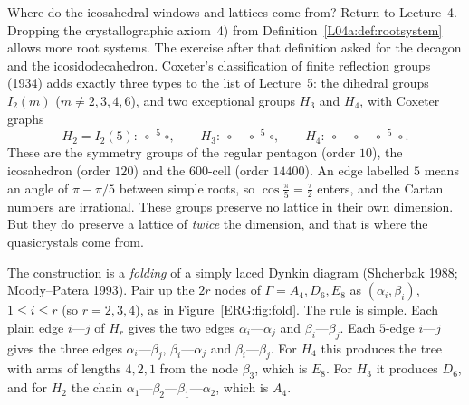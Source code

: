 \documentclass[11pt,openany]{book}
\theoremstyle{plain}
\theoremstyle{definition}
\theoremstyle{remark}
\begin{document}
Where do the icosahedral windows and lattices come from? Return to Lecture~4. Dropping the
crystallographic axiom~4) from Definition~\ref{L04a:def:rootsystem} allows more root systems. The
exercise after that definition asked for the decagon and the icosidodecahedron. Coxeter's classification
of finite reflection groups (1934) adds exactly three types to the list of Lecture~5: the dihedral groups
$I_2(m)$ ($m\neq2,3,4,6$), and two exceptional groups $H_3$ and $H_4$, with Coxeter graphs
\[
  H_2=I_2(5):\ \circ\overset{5}{\text{---}}\circ,\qquad
  H_3:\ \circ\text{---}\circ\overset{5}{\text{---}}\circ,\qquad
  H_4:\ \circ\text{---}\circ\text{---}\circ\overset{5}{\text{---}}\circ .
\]
These are the symmetry groups of the regular pentagon (order $10$), the icosahedron (order $120$) and the
$600$-cell (order $14400$). An edge labelled $5$ means an angle of $\pi-\pi/5$ between simple roots, so
$\cos\frac\pi5=\frac\tau2$ enters, and the Cartan numbers are irrational. These groups preserve no lattice
in their own dimension. But they do preserve a lattice of \emph{twice} the dimension, and that is where
the quasicrystals come from.

The construction is a \emph{folding} of a simply laced Dynkin diagram (Shcherbak 1988; Moody--Patera
1993). Pair up the $2r$ nodes of $\Gamma=A_4,D_6,E_8$ as $(\alpha_i,\beta_i)$, $1\le i\le r$ (so $r=2,3,4$), as in
Figure~\ref{ERG:fig:fold}. The rule is simple. Each plain edge $i$---$j$ of $H_r$ gives the two edges
$\alpha_i$---$\alpha_j$ and $\beta_i$---$\beta_j$. Each $5$-edge $i$---$j$ gives the three edges
$\alpha_i$---$\beta_j$, $\beta_i$---$\alpha_j$ and $\beta_i$---$\beta_j$. For $H_4$ this produces the
tree with arms of lengths $4,2,1$ from the node $\beta_3$, which is $E_8$. For $H_3$ it produces $D_6$, and
for $H_2$ the chain $\alpha_1$---$\beta_2$---$\beta_1$---$\alpha_2$, which is $A_4$.
\end{document}
